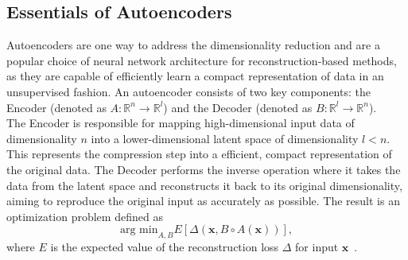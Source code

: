 \subsection{Essentials of Autoencoders}
Autoencoders are one way to address the dimensionality reduction and are a popular choice of neural network architecture for reconstruction-based methods, as they are capable of efficiently learn a compact representation of data in an unsupervised fashion. An autoencoder consists of two key components: the Encoder (denoted as $ A:\mathbb{R}^n \rightarrow{} \mathbb{R}^l$) and the Decoder (denoted as $ B:\mathbb{R}^l \rightarrow{} \mathbb{R}^n$).\\
The Encoder is responsible for mapping high-dimensional input data of dimensionality $ n $ into a lower-dimensional latent space of dimensionality $ l < n $. This represents the compression step into a efficient, compact representation of the original data. The Decoder performs the inverse operation where it takes the data from the latent space and reconstructs it back to its original dimensionality, aiming to reproduce the original input as accurately as possible. The result is an optimization problem defined as
\[ \text{arg min}_{A,B}E[\Delta (\mathbf{x}, B \circ A(\mathbf{x}))], \]
where $ E $ is the expected value of the reconstruction loss $ \Delta $ for input $ \mathbf{x} $~\cite{bank2023autoencoders}.


